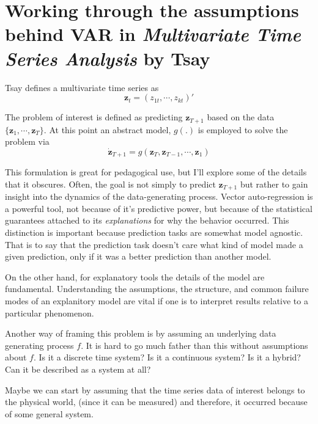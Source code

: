 \documentclass{article}
\begin{document}
    \section{Working through the assumptions behind VAR in \textit{Multivariate
    Time Series Analysis} by Tsay}
   
        Tsay defines a multivariate time series as
        \[
            \mathbf{z}_t = (z_{1t}, \cdots, z_{kt})'
        \]
    
        The problem of interest is defined as predicting $\mathbf{z}_{T+1}$ based on
        the data $\{\mathbf{z}_1, \cdots, \mathbf{z}_T\}$. At this point an abstract
        model, $g(.)$ is employed to solve the problem via
        \[
            \dot{\mathbf{z}}_{T+1} = g(\mathbf{z}_T, \mathbf{z}_{T-1}, \cdots, \mathbf{z}_1)
        \]
    
        This formulation is great for pedagogical use, but I'll explore
        some of the details that it obscures. Often, the goal is not
        simply to predict $\mathbf{z}_{T+1}$ but rather to gain
        insight into the dynamics of the data-generating process. Vector
        auto-regression is a powerful tool, not because of it's
        predictive power, but because of the statistical guarantees
        attached to its \textit{explanations} for why the behavior
        occurred. This distinction is important because prediction
        tasks are somewhat model agnostic. That is to say that
        the prediction task doesn't care what kind of model made
        a given prediction, only if it was a better prediction
        than another model.
   
   
        On the other hand, for explanatory tools the details of the model
        are fundamental. Understanding the assumptions, the structure,
        and common failure modes of an explanitory model are vital if 
        one is to interpret results relative to a particular phenomenon.
    
        Another way of framing this problem is by assuming an underlying
        data generating process $f$. It is hard to go much father than this
        without assumptions about $f$. Is it a discrete time system?
        Is it a continuous system? Is it a hybrid? Can it be described
        as a system at all?
    
        Maybe we can start by assuming that the time series
        data of interest belongs to the physical world,
        (since it can be
        measured) and therefore, it occurred because of some general
        system.
    
\end{document}
